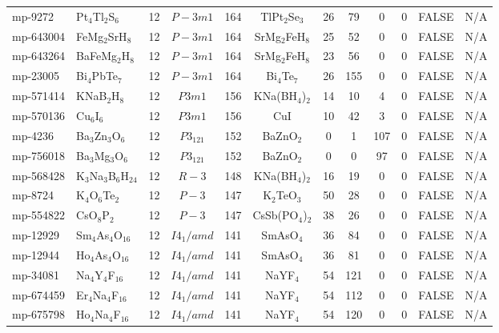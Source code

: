 {\begin{longtable}{llcccccccccc}
    mp-9272 & Pt$_{4}$Tl$_{2}$S$_{6}$ & 12    & $P-3m1$ & 164   & TlPt$_{2}$Se$_{3}$ & 26    & 79    & 0     & 0     & FALSE & N/A \\
    mp-643004 & FeMg$_{2}$SrH$_{8}$ & 12    & $P-3m1$ & 164   & SrMg$_{2}$FeH$_{8}$ & 25    & 52    & 0     & 0     & FALSE & N/A \\
    mp-643264 & BaFeMg$_{2}$H$_{8}$ & 12    & $P-3m1$ & 164   & SrMg$_{2}$FeH$_{8}$ & 23    & 56    & 0     & 0     & FALSE & N/A \\
    mp-23005 & Bi$_{4}$PbTe$_{7}$ & 12    & $P-3m1$ & 164   & Bi$_{4}$Te$_{7}$ & 26    & 155   & 0     & 0     & FALSE & N/A \\
    mp-571414 & KNaB$_{2}$H$_{8}$ & 12    & $P3m1$ & 156   & KNa(BH$_{4}$)$_{2}$ & 14    & 10    & 4     & 0     & FALSE & N/A \\
    mp-570136 & Cu$_{6}$I$_{6}$ & 12    & $P3m1$ & 156   & CuI   & 10    & 42    & 3     & 0     & FALSE & N/A \\
    mp-4236 & Ba$_{3}$Zn$_{3}$O$_{6}$ & 12    & $P3_121$ & 152   & BaZnO$_{2}$ & 0     & 1     & 107   & 0     & FALSE & N/A \\
    mp-756018 & Ba$_{3}$Mg$_{3}$O$_{6}$ & 12    & $P3_121$ & 152   & BaZnO$_{2}$ & 0     & 0     & 97    & 0     & FALSE & N/A \\
    mp-568428 & K$_{3}$Na$_{3}$B$_{6}$H$_{24}$ & 12    & $R-3$ & 148   & KNa(BH$_{4}$)$_{2}$ & 16    & 19    & 0     & 0     & FALSE & N/A \\
    mp-8724 & K$_{4}$O$_{6}$Te$_{2}$ & 12    & $P-3$ & 147   & K$_{2}$TeO$_{3}$ & 50    & 28    & 0     & 0     & FALSE & N/A \\
    mp-554822 & CsO$_{8}$P$_{2}$ & 12    & $P-3$ & 147   & CsSb(PO$_{4}$)$_{2}$ & 38    & 26    & 0     & 0     & FALSE & N/A \\
    mp-12929 & Sm$_{4}$As$_{4}$O$_{16}$ & 12    & $I4_1/amd$ & 141   & SmAsO$_{4}$ & 36    & 84    & 0     & 0     & FALSE & N/A \\
    mp-12944 & Ho$_{4}$As$_{4}$O$_{16}$ & 12    & $I4_1/amd$ & 141   & SmAsO$_{4}$ & 36    & 81    & 0     & 0     & FALSE & N/A \\
    mp-34081 & Na$_{4}$Y$_{4}$F$_{16}$ & 12    & $I4_1/amd$ & 141   & NaYF$_{4}$ & 54    & 121   & 0     & 0     & FALSE & N/A \\
    mp-674459 & Er$_{4}$Na$_{4}$F$_{16}$ & 12    & $I4_1/amd$ & 141   & NaYF$_{4}$ & 54    & 112   & 0     & 0     & FALSE & N/A \\
    mp-675798 & Ho$_{4}$Na$_{4}$F$_{16}$ & 12    & $I4_1/amd$ & 141   & NaYF$_{4}$ & 54    & 120   & 0     & 0     & FALSE & N/A \\

\end{longtable}}
